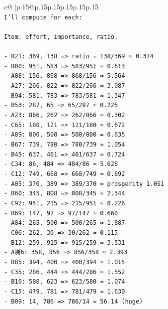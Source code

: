 \documentclass{article}
\begin{document}
{\begin{supertabular}{c@{$\;$}|p{.15\linewidth}@{}p{.15\linewidth}p{.15\linewidth}p{.15\linewidth}p{.15\linewidth}p{.15\linewidth}}
{{{\\ 
\texttt{I'll compute for each:} \\
\\ 
\texttt{Item: effort, importance, ratio.} \\
\\ 
\texttt{{-} B21: 369, 138 => ratio = 138/369 ≈ 0.374} \\
\texttt{{-} B00: 951, 583 => 583/951 ≈ 0.613} \\
\texttt{{-} A08: 156, 868 => 868/156 ≈ 5.564} \\
\texttt{{-} A27: 266, 822 => 822/266 ≈ 3.087} \\
\texttt{{-} B94: 581, 783 => 783/581 ≈ 1.347} \\
\texttt{{-} B53: 287, 65 => 65/287 ≈ 0.226} \\
\texttt{{-} A23: 866, 262 => 262/866 ≈ 0.302} \\
\texttt{{-} C65: 180, 121 => 121/180 ≈ 0.672} \\
\texttt{{-} A89: 800, 508 => 508/800 = 0.635} \\
\texttt{{-} B67: 739, 780 => 780/739 ≈ 1.054} \\
\texttt{{-} B45: 637, 461 => 461/637 ≈ 0.724} \\
\texttt{{-} C34: 86, 484 => 484/86 ≈ 5.628} \\
\texttt{{-} C12: 749, 668 => 668/749 ≈ 0.892} \\
\texttt{{-} A05: 370, 389 => 389/370 ≈  prosperity 1.051} \\
\texttt{{-} B60: 345, 808 => 808/345 ≈ 2.344} \\
\texttt{{-} C92: 951, 215 => 215/951 ≈ 0.226} \\
\texttt{{-} B69: 147, 97 => 97/147 ≈ 0.660} \\
\texttt{{-} A84: 265, 500 => 500/265 ≈ 1.887} \\
\texttt{{-} C06: 262, 30 => 30/262 ≈ 0.115} \\
\texttt{{-} B12: 259, 915 => 915/259 ≈ 3.531} \\
\texttt{{-} A襪6: 358, 856 => 856/358 ≈ 2.393} \\
\texttt{{-} B85: 394, 400 => 400/394 ≈ 1.015} \\
\texttt{{-} C35: 286, 444 => 444/286 ≈ 1.552} \\
\texttt{{-} B10: 580, 623 => 623/580 ≈ 1.074} \\
\texttt{{-} C15: 479, 781 => 781/479 ≈ 1.630} \\
\texttt{{-} B09: 14, 786 => 786/14 ≈ 56.14 (huge)} \\
}}}
\end{supertabular}}
\end{document}
